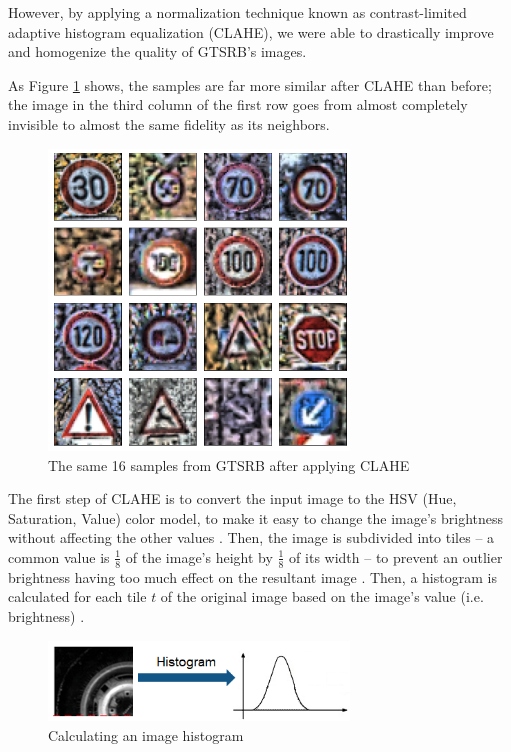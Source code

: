 \documentclass[10pt,twocolumn,letterpaper]{article}
\begin{document}
However, by applying a normalization  technique known as contrast-limited adaptive histogram equalization (CLAHE), we were able to drastically improve and homogenize the quality of GTSRB's images. 

As Figure \ref{fig:postclahe} shows, the samples are far more similar after CLAHE than before; the image in the third column of the first row goes from almost completely invisible to almost the same fidelity as its neighbors. 

\begin{figure}[h]
\includegraphics[width=8cm]{example-clahe-after}
\centering
\caption{The same 16 samples from GTSRB after applying CLAHE}
\label{fig:postclahe}
\end{figure}



The first step of CLAHE is to convert the input image to the HSV (Hue, Saturation, Value) color model, to make it easy to change the image's brightness without affecting the other values \cite{clahe}. Then, the image is subdivided into tiles -- a common value is $\frac{1}{8}$ of the image's height by $\frac{1}{8}$ of its width -- to prevent an outlier brightness having too much effect on the resultant image \cite{clahe}. Then, a histogram is calculated for each tile $t$ of the original image based on the image's value (i.e. brightness) \cite{clahe}. 

\begin{figure}[h]
\includegraphics[width=8cm]{clahe-step-1}
\centering
\caption{Calculating an image histogram \cite{clahe}}
\end{figure}
\end{document}
